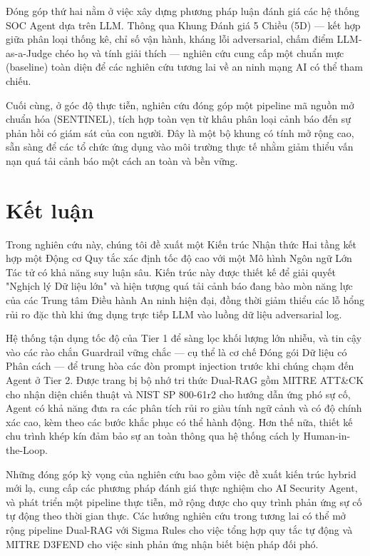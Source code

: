 \documentclass[12pt,a4paper]{article}
\begin{document}
Đóng góp thứ hai nằm ở việc xây dựng phương pháp luận đánh giá các hệ thống SOC Agent dựa trên LLM. Thông qua Khung Đánh giá 5 Chiều (5D) — kết hợp giữa phân loại thống kê, chỉ số vận hành, kháng lỗi adversarial, chấm điểm LLM-as-a-Judge chéo họ và tính giải thích — nghiên cứu cung cấp một chuẩn mực (baseline) toàn diện để các nghiên cứu tương lai về an ninh mạng AI có thể tham chiếu.

Cuối cùng, ở góc độ thực tiễn, nghiên cứu đóng góp một pipeline mã nguồn mở chuẩn hóa (SENTINEL), tích hợp toàn vẹn từ khâu phân loại cảnh báo đến sự phản hồi có giám sát của con người. Đây là một bộ khung có tính mở rộng cao, sẵn sàng để các tổ chức ứng dụng vào môi trường thực tế nhằm giảm thiểu vấn nạn quá tải cảnh báo một cách an toàn và bền vững.

\newpage
\section{Kết luận}
Trong nghiên cứu này, chúng tôi đề xuất một Kiến trúc Nhận thức Hai tầng kết hợp một Động cơ Quy tắc xác định tốc độ cao với một Mô hình Ngôn ngữ Lớn Tác tử có khả năng suy luận sâu. Kiến trúc này được thiết kế để giải quyết "Nghịch lý Dữ liệu lớn" và hiện tượng quá tải cảnh báo đang bào mòn năng lực của các Trung tâm Điều hành An ninh hiện đại, đồng thời giảm thiểu các lỗ hổng rủi ro đặc thù khi ứng dụng trực tiếp LLM vào luồng dữ liệu adversarial log.

Hệ thống tận dụng tốc độ của Tier 1 để sàng lọc khối lượng lớn nhiễu, và tin cậy vào các rào chắn Guardrail vững chắc — cụ thể là cơ chế Đóng gói Dữ liệu có Phân cách — để trung hòa các đòn prompt injection trước khi chúng chạm đến Agent ở Tier 2. Được trang bị bộ nhớ tri thức Dual-RAG gồm MITRE ATT\&CK cho nhận diện chiến thuật và NIST SP 800-61r2 cho hướng dẫn ứng phó sự cố, Agent có khả năng đưa ra các phân tích rủi ro giàu tính ngữ cảnh và có độ chính xác cao, kèm theo các bước khắc phục có thể hành động. Hơn thế nữa, thiết kế chu trình khép kín đảm bảo sự an toàn thông qua hệ thống cách ly Human-in-the-Loop.

Những đóng góp kỳ vọng của nghiên cứu bao gồm việc đề xuất kiến trúc hybrid mới lạ, cung cấp các phương pháp đánh giá thực nghiệm cho AI Security Agent, và phát triển một pipeline thực tiễn, mở rộng được cho quy trình phản ứng sự cố tự động theo thời gian thực. Các hướng nghiên cứu trong tương lai có thể mở rộng pipeline Dual-RAG với Sigma Rules cho việc tổng hợp quy tắc tự động và MITRE D3FEND cho việc sinh phản ứng nhận biết biện pháp đối phó.
\end{document}
